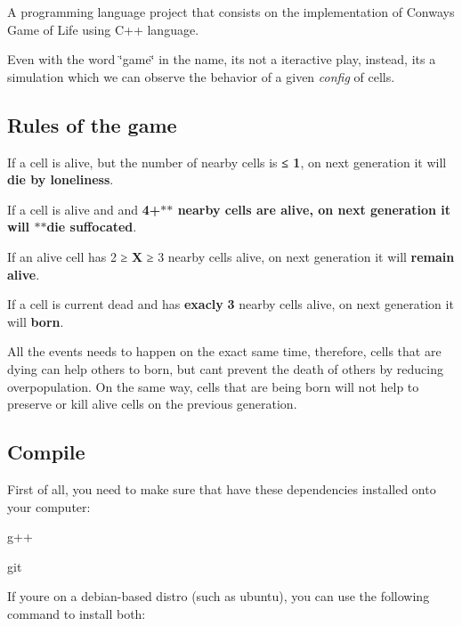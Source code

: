 A programming language project that consists on the implementation of Conway\textquotesingle{}s Game of Life using C++ language.

Even with the word \char`\"{}game\char`\"{} in the name, it\textquotesingle{}s not a iteractive play, instead, it\textquotesingle{}s a simulation which we can observe the behavior of a given {\itshape config} of cells.

\subsection*{Rules of the game}


\begin{DoxyEnumerate}
\item If a cell is alive, but the number of nearby cells is {\bfseries ≤ 1}, on next generation it will {\bfseries die by loneliness}.
\item If a cell is alive and and {\bfseries 4+$\ast$$\ast$ nearby cells are alive, on next generation it will $\ast$$\ast$die suffocated}.
\item If an alive cell has 2 ≥ {\bfseries X} ≥ 3 nearby cells alive, on next generation it will {\bfseries remain alive}.
\item If a cell is current dead and has {\bfseries exacly} {\bfseries 3} nearby cells alive, on next generation it will {\bfseries born}.
\item All the events needs to happen on the exact same time, therefore, cells that are dying can help others to born, but can\textquotesingle{}t prevent the death of others by reducing overpopulation. On the same way, cells that are being born will not help to preserve or kill alive cells on the previous generation.
\end{DoxyEnumerate}

\subsection*{Compile}

First of all, you need to make sure that have these dependencies installed onto your computer\+:


\begin{DoxyItemize}
\item {\ttfamily g++}
\item {\ttfamily git}
\end{DoxyItemize}

If you\textquotesingle{}re on a debian-\/based distro (such as ubuntu), you can use the following command to install both\+:



